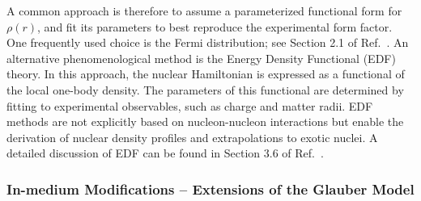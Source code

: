 \begin{description}
A common approach is therefore to assume a parameterized functional form for \( \rho(r) \), and fit its parameters to best reproduce the experimental form factor. One frequently used choice is the Fermi distribution; see Section 2.1 of Ref.~\cite{mayer2013kernphysik}.
An alternative phenomenological method is the Energy Density Functional (EDF) theory. In this approach, the nuclear Hamiltonian is expressed as a functional of the local one-body density. The parameters of this functional are determined by fitting to experimental observables, such as charge and matter radii. EDF methods are not explicitly based on nucleon-nucleon interactions but enable the derivation of nuclear density profiles and extrapolations to exotic nuclei. A detailed discussion of EDF can be found in Section 3.6 of Ref.~\cite{obertelli2021modern}.

\end{description}

\subsubsection{In-medium Modifications -- Extensions of the Glauber Model}\label{sec:glauber_ext}

